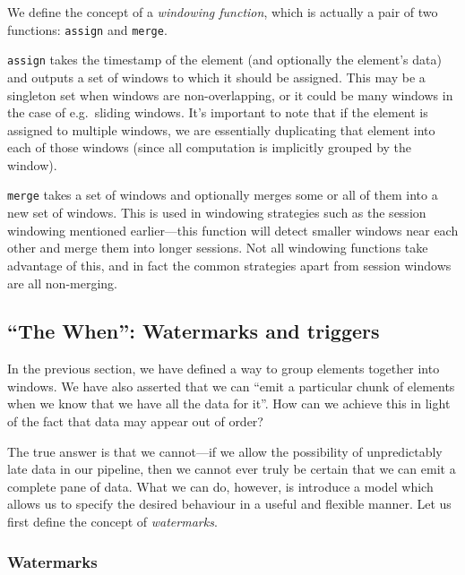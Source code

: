 We define the concept of a \emph{windowing function}, which is actually a pair of two functions: \texttt{assign} and \texttt{merge}.

\texttt{assign} takes the timestamp of the element (and optionally the element's data) and outputs a set of windows to which it should be assigned.
This may be a singleton set when windows are non-overlapping, or it could be many windows in the case of e.g.\ sliding windows.
It's important to note that if the element is assigned to multiple windows, we are essentially duplicating that element into each of those windows (since all computation is implicitly grouped by the window).

\texttt{merge} takes a set of windows and optionally merges some or all of them into a new set of windows.
This is used in windowing strategies such as the session windowing mentioned earlier---this function will detect smaller windows near each other and merge them into longer sessions.
Not all windowing functions take advantage of this, and in fact the common strategies apart from session windows are all non-merging.



\subsection{``The When'': Watermarks and triggers}\label{sec:prep:dataflow:when}

In the previous section, we have defined a way to group elements together into windows.
We have also asserted that we can ``emit a particular chunk of elements when we know that we have all the data for it''.
How can we achieve this in light of the fact that data may appear out of order?

The true answer is that we cannot---if we allow the possibility of unpredictably late data in our pipeline, then we cannot ever truly be certain that we can emit a complete pane of data.
What we can do, however, is introduce a model which allows us to specify the desired behaviour in a useful and flexible manner.
Let us first define the concept of \emph{watermarks}.

\subsubsection{Watermarks}

